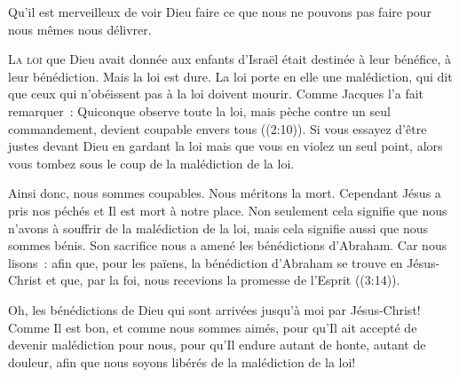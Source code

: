 Qu'il est merveilleux de voir Dieu faire ce que nous ne pouvons pas faire
 pour nous mêmes \ocadr nous délivrer.

\dvrule






\lettrine{L}{a loi} que Dieu avait donnée aux enfants d'Israël
 était destinée à leur bénéfice, à leur bénédiction.
 Mais la loi est dure. La loi porte en elle une malédiction,
 qui dit que ceux qui n'obéissent pas à la loi doivent mourir.
 Comme Jacques l'a fait remarquer~: 
 \og Quiconque observe toute la loi, mais pèche contre un seul commandement,
 devient coupable envers tous \fg{} ((2:10)).
 Si vous essayez d'être justes devant Dieu en gardant la loi
 mais que vous en violez un seul point,
 alors vous tombez sous le coup de la malédiction de la loi.

Ainsi donc, nous sommes coupables. Nous méritons la mort.
 Cependant Jésus a pris nos péchés et Il est mort à notre place.
 Non seulement cela signifie que nous n'avons à souffrir de la malédiction
 de la loi, mais cela signifie aussi que nous sommes bénis.
 Son sacrifice nous a amené les bénédictions d'Abraham.
 Car nous lisons~: 
 \og afin que, pour les païens, la bénédiction d'Abraham se trouve
 en Jésus-Christ et que, par la foi, nous recevions la promesse
 de l'Esprit \fg{} ((3:14)).


Oh, les bénédictions de Dieu qui sont arrivées jusqu'à moi
 par Jésus-Christ! Comme Il est bon, et comme nous sommes aimés,
 pour qu'Il ait accepté de devenir malédiction pour nous,
 pour qu'Il endure autant de honte, autant de douleur,
 afin que nous soyons libérés de la malédiction de la loi!

\dvrule


